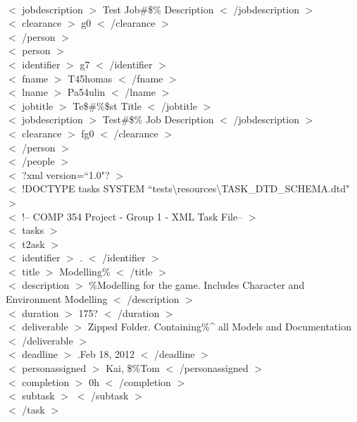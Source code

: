 \documentclass[12pt]{article}
\newcommand{\tab}{\hspace*{2em}}
\begin{document}
{\\ \tab\tab $<$ jobdescription $>$ Test Job\#\$\% Description $<$ /jobdescription $>$ 
\\ \tab\tab $<$ clearance $>$ g0 $<$ /clearance $>$ 
\\ \tab$<$ /person $>$ 
\\ \tab$<$ person $>$ 
\\ \tab\tab $<$ identifier $>$ g7 $<$ /identifier $>$ 
\\ \tab\tab $<$ fname $>$ T45homas $<$ /fname $>$ 
\\ \tab\tab $<$ lname $>$ Pa54ulin $<$ /lname $>$ 
\\ \tab\tab $<$ jobtitle $>$ Te\$\#\%\$st Title $<$ /jobtitle $>$ 
\\ \tab\tab $<$ jobdescription $>$ Test\#\$\% Job Description $<$ /jobdescription $>$ 
\\ \tab\tab $<$ clearance $>$ fg0 $<$ /clearance $>$ 
\\ \tab$<$ /person $>$ 
\\ $<$ /people $>$ 
\\ $<$ ?xml version=``1.0"? $>$ 
\\ $<$ !DOCTYPE tasks SYSTEM ``tests\textbackslash resources\textbackslash TASK\_DTD\_SCHEMA.dtd" $>$ 
\\ $<$ !-- COMP 354 Project - Group 1 - XML Task File-- $>$ 
\\ $<$ tasks $>$ 
\\ \tab$<$ t2ask $>$ 
\\ \tab    \tab $<$ identifier $>$ . $<$ /identifier $>$ 
\\ \tab    \tab $<$ title $>$ Modelling\% $<$ /title $>$ 
\\ \tab    \tab $<$ description $>$ \-\%Modelling for the game. Includes Character and Environment Modelling $<$ /description $>$ 
\\ \tab    \tab $<$ duration $>$ 175? $<$ /duration $>$ 
\\ \tab    \tab $<$ deliverable $>$ Zipped Folder. Containing\%\^{} all Models and Documentation $<$ /deliverable $>$ 
\\ \tab    \tab $<$ deadline $>$ .Feb 18, 2012 $<$ /deadline $>$ 
\\ \tab    \tab $<$ personassigned $>$ Kai, \$\%Tom $<$ /personassigned $>$ 
\\ \tab    \tab $<$ completion $>$ 0h $<$ /completion $>$ 
\\ \tab    \tab $<$ subtask $>$  $<$ /subtask $>$ 
\\ \tab$<$ /task $>$ 
}
\end{document}
